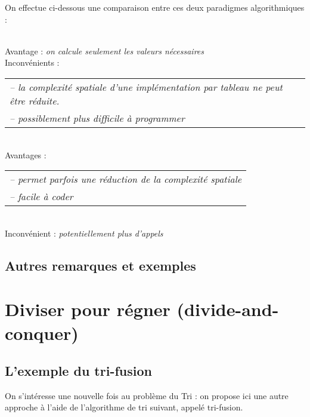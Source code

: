  		On effectue ci-dessous une comparaison entre ces deux paradigmes algorithmiques :
 		\begin{addmargin}{5mm}
 		 \\
 			Avantage : \textit{on calcule seulement les valeurs nécessaires} \\
 			Inconvénients : \hspace{-4mm}
 				\begin{tabular}[t]{l}
 					\textit{-- la complexité spatiale d'une implémentation par tableau ne peut être réduite.} \\
 					\textit{-- possiblement plus difficile à programmer}
 				\end{tabular}
 			
 		\pagebreak
 		 \\
 		Avantages : \hspace{-4mm}
 			\begin{tabular}[t]{l}
 				\textit{-- permet parfois une réduction de la complexité spatiale} \\
 				\textit{-- facile à coder}
 			\end{tabular} \\
 		Inconvénient : \textit{potentiellement plus d'appels}
 		\end{addmargin} 

\subsection{Autres remarques et exemples}
 		
\section{Diviser pour régner (divide-and-conquer)}

	\subsection{L'exemple du tri-fusion}
	
		On s'intéresse une nouvelle fois au problème du \textsf{Tri} : on propose ici une autre approche à l'aide de l'algorithme de tri suivant, appelé tri-fusion.
		
